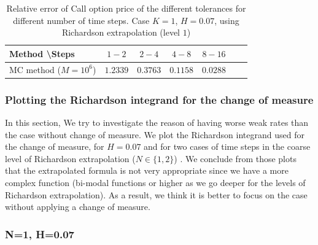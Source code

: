 \documentclass[11pt]{article}
\begin{document}
 
 
 \begin{table}[h!]
 	\centering
 	\begin{tabular}{l*{5}{c}r}
 		Method \textbackslash  Steps &$1-2$             & $2-4$ & $4-8$ & $8-16$ \\
 		\hline	
 		MC method ($M=10^{6}$)  &$\mathbf{1.2339}$  & $\mathbf{0.3763}$  & $\mathbf{0.1158}$  & $\mathbf{0.0288}$ \\
 		\hline	
 		
 	\end{tabular}
 	\caption{Relative error of Call option price of the different tolerances for different number of time steps. Case $K=1$, $H=0.07$, using Richardson extrapolation (level $1$)}
 	\label{Relative error of Call option price of the different tolerances for different number of time steps. Case $K=1, H=0.07$ , using Richardson extrapolation_change_measure}
 \end{table}
 
 
 
 
 \subsubsection{Plotting the Richardson integrand for the change of measure}\label{sec:Plotting the Richardson integrand for the change of measure}
 In this section, We try to investigate the reason of having worse weak rates than the case without change of measure. We plot the Richardson integrand used for the change of measure, for $H=0.07$ and for  two cases of time steps in the coarse level of Richardson extrapolation ($N \in \{1,2\}$) . We conclude from those plots  that  the extrapolated formula is not very appropriate since we have a more complex function (bi-modal functions or higher as we go deeper for the levels of Richardson extrapolation). As a result, we think it is better to focus on the case without applying a change of measure.
 
 
 \subsubsection*{N=1, H=0.07}
 
\end{document}
